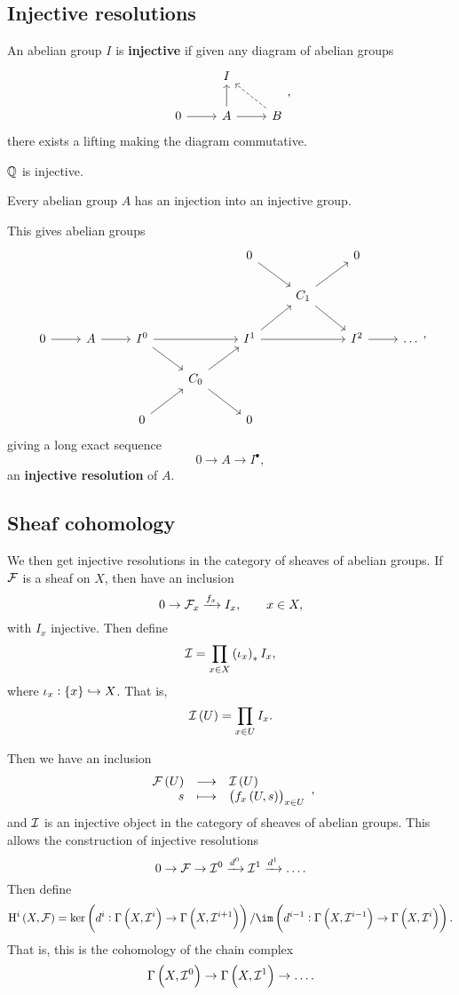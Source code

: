 \subsection{Injective resolutions}


An abelian group $ I $ is \textbf{injective} if given any diagram of abelian groups
$$
\begin{tikzcd}
& I & \\
0 \arrow{r} & A \arrow{u} \arrow{r} & B \arrow[dashed]{ul}
\end{tikzcd},
$$
there exists a lifting making the diagram commutative.

\begin{example*}
$ \mathbb{Q} $ is injective.
\end{example*}

\begin{fact*}
Every abelian group $ A $ has an injection into an injective group.
\end{fact*}

This gives abelian groups
$$
\begin{tikzcd}
& & & & 0 \arrow{dr} & & 0 & \\
& & & & & C_1 \arrow{ur} \arrow{dr} & & \\
0 \arrow{r} & A \arrow{r} & I^0 \arrow{rr} \arrow{dr} & & I^1 \arrow{ur} \arrow{rr} & & I^2 \arrow{r} & \dots \\
& & & C_0 \arrow{ur} \arrow{dr} & & & & \\
& & 0 \arrow{ur} & & 0 & & &
\end{tikzcd},
$$
giving a long exact sequence
$$ 0 \to A \to I^\bullet, $$
an \textbf{injective resolution} of $ A $.

\subsection{Sheaf cohomology}

We then get injective resolutions in the category of sheaves of abelian groups. If $ \mathcal{F} $ is a sheaf on $ X $, then have an inclusion
$$ 0 \to \mathcal{F}_x \xrightarrow{f_x} I_x, \qquad x \in X, $$
with $ I_x $ injective. Then define
$$ \III = \prod_{x \in X} \br{\iota_x}_*I_x, $$
where $ \iota_x : \cbr{x} \hookrightarrow X $. That is,
$$ \III\br{U} = \prod_{x \in U} I_x. $$

\pagebreak

Then we have an inclusion
$$ \function{\FFF\br{U}}{\III\br{U}}{s}{\br{f_x\br{U, s}}_{x \in U}}, $$
and $ \mathcal{I} $ is an injective object in the category of sheaves of abelian groups. This allows the construction of injective resolutions
$$ 0 \to \mathcal{F} \to \mathcal{I}^0 \xrightarrow{d^0} \mathcal{I}^1 \xrightarrow{d^1} \dots. $$
Then define
$$ \H^i\br{X, \FFF} = \ker \br{d^i : \Gamma\br{X, \III^i} \to \Gamma\br{X, \III^{i + 1}}} / \im \br{d^{i - 1} : \Gamma\br{X, \III^{i - 1}} \to \Gamma\br{X, \III^i}}. $$
That is, this is the cohomology of the chain complex
$$ \Gamma\br{X, \III^0} \to \Gamma\br{X, \III^1} \to \dots. $$

